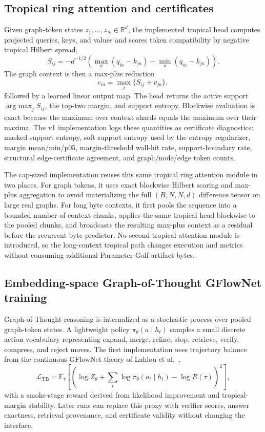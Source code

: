 \documentclass[11pt]{article}
\newcommand{\R}{\mathbb{R}}
\newcommand{\E}{\mathbb{E}}
\newcommand{\argmax}{\operatorname*{arg\ max}}
\begin{document}
\subsection{Tropical ring attention and certificates}
Given graph-token states \(z_1,\ldots,z_N\in\R^d\), the implemented tropical head computes projected queries, keys, and values and scores token compatibility by negative tropical Hilbert spread,
\[
  S_{ij}=-d^{-1/2}\left(\max_a(q_{ia}-k_{ja})-\min_a(q_{ia}-k_{ja})\right).
\]
The graph context is then a max-plus reduction
\[
  c_{ia}=\max_j\{S_{ij}+v_{ja}\},
\]
followed by a learned linear output map.  The head returns the active support \(\argmax_j S_{ij}\), the top-two margin, and support entropy.  Blockwise evaluation is exact because the maximum over context shards equals the maximum over their maxima.  The v1 implementation logs these quantities as certificate diagnostics: masked support entropy, soft support entropy used by the entropy regularizer, margin mean/min/p05, margin-threshold wall-hit rate, support-boundary rate, structural edge-certificate agreement, and graph/node/edge token counts.

The cap-sized implementation reuses this same tropical ring attention module in two places.  For graph tokens, it uses exact blockwise Hilbert scoring and max-plus aggregation to avoid materializing the full \((B,N,N,d)\) difference tensor on large real graphs.  For long byte contexts, it first pools the sequence into a bounded number of context chunks, applies the same tropical head blockwise to the pooled chunks, and broadcasts the resulting max-plus context as a residual before the recurrent byte predictor.  No second tropical attention module is introduced, so the long-context tropical path changes execution and metrics without consuming additional Parameter-Golf artifact bytes.

\subsection{Embedding-space Graph-of-Thought GFlowNet training}
Graph-of-Thought reasoning \cite{besta2024got} is internalized as a stochastic process over pooled graph-token states.  A lightweight policy \(\pi_\theta(a\mid h_t)\) samples a small discrete action vocabulary representing expand, merge, refine, stop, retrieve, verify, compress, and reject moves.  The first implementation uses trajectory balance from the continuous GFlowNet theory of Lahlou et al.\ \cite{lahlou2023continuousgfn},
\[
  \mathcal L_{\mathrm{TB}}=\E_\tau\left[\left(\log Z_\theta+\sum_t\log\pi_\theta(a_t\mid h_t)-\log R(\tau)\right)^2\right],
\]
with a smoke-stage reward derived from likelihood improvement and tropical-margin stability.  Later runs can replace this proxy with verifier scores, answer exactness, retrieval provenance, and certificate validity without changing the interface.
\end{document}
